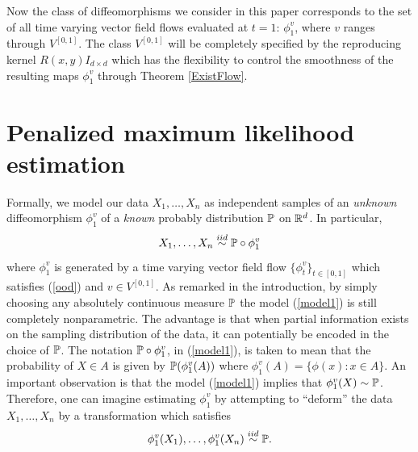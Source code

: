 \documentclass[noinfoline]{imsart}
\begin{document}
 Now the class of diffeomorphisms we consider in this paper  corresponds to the set of all time varying vector field flows evaluated at $t=1$: $\phi^v_1$, where $v$ ranges through $V^{[0,1]}$. The class $V^{[0,1]}$ will be completely specified by the reproducing kernel $R(x,y)I_{d\times d}$ which has the flexibility to control the smoothness of the resulting maps $\phi_1^v$ through Theorem \ref{ExistFlow}.
%
\section{Penalized maximum likelihood estimation}
\label{pmle}


Formally, we model our data   $X_1,\ldots, X_n$ as independent samples of an {\it unknown} diffeomorphism $\phi^v_1$ of a {\it known} probably distribution $\Bbb P$ on $\Bbb R^d$. In particular,
\begin{equation}
\label{model1}
X_1,\ldots,X_n\overset{iid}\sim \Bbb P\circ \phi_1^v
\end{equation}
where  $\phi^v_1$ is generated by a time varying vector field flow $\{\phi^v_t\}_{t\in[0,1]}$ which satisfies (\ref{ood}) and $v\in V^{[0,1]}$.
As remarked in the introduction, by simply choosing any absolutely continuous measure  $\Bbb P$ the
model (\ref{model1}) is still completely nonparametric.  The advantage is that when partial information exists on the sampling distribution of the data, it can potentially be encoded in the choice of $\Bbb P$.
The notation $\Bbb P\circ \phi^v_1$, in (\ref{model1}), is taken to mean that the probability of $X\in A$ is given by   $ \Bbb P(\phi^v_1(A))$ where $\phi_1^v(A)=\{ \phi(x)\colon x\in A \}$. An important observation is that the model (\ref{model1}) implies that $\phi_1^v(X)\sim \Bbb P$. Therefore, one can imagine estimating $\phi_1^v$ by attempting to ``deform'' the data $X_1,\ldots,X_n$ by a transformation which satisfies
\[ \phi_1^v(X_1),\ldots,\phi_1^v(X_n)\overset{iid}\sim \Bbb P. \]
\end{document}
